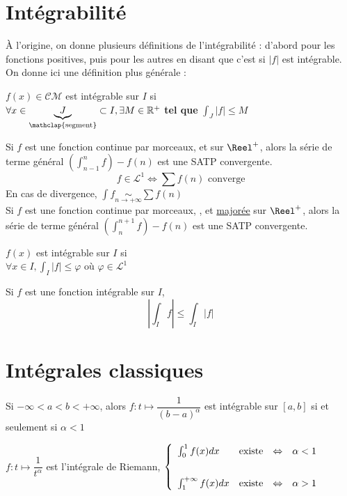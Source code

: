 \documentclass[11pt,a4paper,fleqn,pdftex]{report}
\begin{document}
\section{Intégrabilité}
À l'origine, on donne plusieurs définitions de l'intégrabilité : d'abord pour les fonctions positives, puis pour les autres en disant que c'est si $|f|$ est intégrable. On donne ici une définition plus générale : 
\begin{dfn}
$f(x)\in \mathcal{CM}$ est intégrable sur $I$ si \\
$\forall x \in \underbrace{J}_{\mathclap{\text{segment}}} \subset I, \exists M \in \mathbb{R}^+$ \textbf{tel que} $\int_J |f| \le M$
\end{dfn}
\begin{itheorem}
    Si $f$ est une fonction continue par morceaux,  et   sur $\Reel^+$, alors la série de terme général $\left( \int_{n-1}^n f \right) - f(n) $ est une \gls{SATP} convergente.\\
    \begin{equation}
        f \in \mathcal{L}^1 \Leftrightarrow \sum f(n) \text{ converge}
    \end{equation}
    En cas de divergence, $\int f \underset{n \to +\infty}{\sim}\sum f(n)$\\[\baselineskip]

    Si $f$ est une fonction continue par morceaux, ,  et \textcolor{couleurImp}{\uline{majorée}} sur $\Reel^+$, alors la série de terme général $\left( \int_n^{n+1} f \right) - f(n)$ est une \gls{SATP} convergente.
\end{itheorem}
\begin{itheorem}
$f(x)$ est intégrable sur $I$ si \\
$\forall x \in I, \boxed{\int_I |f| \le \varphi}$ où $\varphi \in \mathcal{L}^1$
\end{itheorem}
\begin{theorem}
Si $f$ est une fonction intégrable sur $I$,
    \begin{equation}\label{eq:SommeIntegrale}
        \left| \int_I f \right| \le \int_I \left| f \right| 
    \end{equation}
\end{theorem}
\section{Intégrales classiques}
\begin{theorem}
Si $-\infty < a < b < +\infty$, alors $f:t\mapsto \dfrac{1}{(b-a)^\alpha}$ est intégrable sur $[a,b]$ si et seulement si $\boxed{\alpha < 1}$
\end{theorem}
\begin{theorem}
$f : t \mapsto \dfrac{1}{t^\alpha}$ est l'intégrale de Riemann,
$
\left\lbrace
\begin{array}{l c c l}
\int_0^1f(x)dx&\text{existe}&\Leftrightarrow&\alpha < 1\\[0.7cm]
\int_1^{+\infty}f(x)dx&\text{existe}&\Leftrightarrow&\alpha > 1
\end{array}
\right.
$
\end{theorem}
\end{document}
